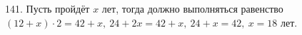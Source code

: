 141. Пусть пройдёт $x$ лет, тогда должно выполняться равенство $(12+x)\cdot2=42+x,\ 24+2x=42+x,\ 24+x=42,\ x=18$ лет.\\
